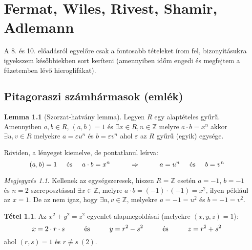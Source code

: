 \documentclass[12pt]{book}
\theoremstyle{plain} %
\theoremstyle{definition} %
\newtheorem{lem/}{Lemma}[section]
\newenvironment{lem}
  {\renewcommand{\qedsymbol}{$\clubsuit$}%
   \pushQED{\qed}\begin{lem/}}
  {\popQED\end{lem/}}
\newtheorem{theo/}{Tétel}[section]
\newenvironment{theo}
  {\renewcommand{\qedsymbol}{$\clubsuit$}%
   \pushQED{\qed}\begin{theo/}}
  {\popQED\end{theo/}}
\theoremstyle{remark}
\newtheorem*{mj}{Megjegyzés}
\renewcommand\qedsymbol{$\blacksquare$}
\numberwithin{equation}{section}  %
\def\Z{\mathbb{Z}}
\begin{document}
	\chapter{Fermat, Wiles, Rivest, Shamir, Adlemann}
	
	A 8. és 10. előadásról egyelőre csak a fontosabb tételeket írom fel, bizonyításukra igyekszem későbbiekben sort keríteni (amennyiben időm engedi és megfejtem a füzetemben lévő hieroglifákat).
	
	\section{Pitagoraszi számhármasok (emlék)}
	
	\begin{lem}[Szorzat-hatvány lemma]\label{szhl}
		Legyen $R$ egy alaptételes gyűrű. Amennyiben $a,b\in R$, $(a,b)=1$ és $\exists x\in R, n\in \Z$ melyre $a\cdot b = x^n$ akkor $\exists u,v\in R$ melyekre $a = \varepsilon u^n$ és $b = \varepsilon v^n$ ahol $\varepsilon$ az $R$ gyűrű (egyik) egysége.
	\end{lem}

	Röviden, a lényeget kiemelve, de pontatlanul leírva:
	\[ (a,b)=1 \hspace{5mm} \text{és} \hspace{5mm} a\cdot b = x^n \hspace{10mm} \Rightarrow \hspace{10mm} a = u^n \hspace{5mm} \text{és} \hspace{5mm} b = v^n  \]
	
	\begin{mj}
		Kellenek az egységszeresek, hiszen $R=\Z$ esetén $a=-1$, $b=-1$ és $n=2$ szereposztással $\exists x\in \Z$, melyre $a\cdot b = (-1)\cdot (-1) = x^2$, ilyen például az $x=1$. De az nem igaz, hogy $\exists u,v\in \Z$, melyekre $a=-1=u^2$ és $b=-1=v^2$.
	\end{mj}
	
	\begin{theo}
		Az $x^2+y^2=z^2$ egyenlet alapmegoldásai (melyekre $(x,y,z)=1$):
		\[ x=2\cdot r \cdot s \hspace{10mm} \text{és} \hspace{10mm} y=r^2-s^2 \hspace{10mm} \text{és} \hspace{10mm} z = r^2 + s^2 \]
		ahol $(r,s)=1$ és $r\not \equiv s\ (2)$.
	\end{theo}
	
\end{document}
